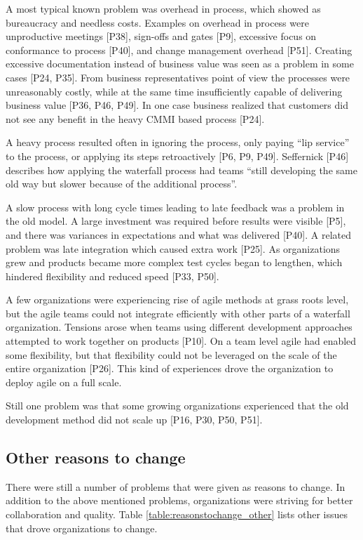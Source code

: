 A most typical known problem was overhead in process, which showed as bureaucracy and
needless costs. Examples on overhead in process were unproductive meetings
[P38], sign-offs and gates [P9], excessive focus on conformance to process
[P40], and change management overhead [P51]. Creating excessive documentation
instead of business value was seen as a problem in some cases [P24, P35]. From
business representatives point of view the processes were unreasonably costly,
while at the same time insufficiently capable of delivering business value [P36,
P46, P49]. In one case business realized that customers did not see any benefit
in the heavy CMMI based process [P24].

A heavy process resulted often in ignoring the process, only paying ``lip
service'' to the process, or applying its steps retroactively [P6, P9, P49].
Seffernick [P46] describes how applying the waterfall process had teams ``still
developing the same old way but slower because of the additional process''.

A slow process with long cycle times leading to late feedback was a problem in
the old model. A large investment was required before results were visible [P5],
and there was variances in expectations and what was delivered [P40]. A related
problem was late integration which caused extra work [P25]. As organizations
grew and products became more complex test cycles began to lengthen, which
hindered flexibility and reduced speed [P33, P50].

A few organizations were experiencing rise of agile methods at grass roots
level, but the agile teams could not integrate efficiently with other parts of
a waterfall organization. Tensions arose when teams using different development
approaches attempted to work together on products [P10]. On a team level agile
had enabled some flexibility, but that flexibility could not be leveraged on the
scale of the entire organization [P26].
This kind of experiences drove the organization to deploy agile on a full scale.

Still one problem was that some growing organizations experienced that the old
development method did not scale up [P16, P30, P50, P51].


\subsection{Other reasons to change}

There were still a number of problems that were given as reasons to change.
In addition to the above mentioned problems, organizations were striving for
better collaboration and quality. Table \ref{table:reasonstochange_other} lists
other issues that drove organizations to change.

